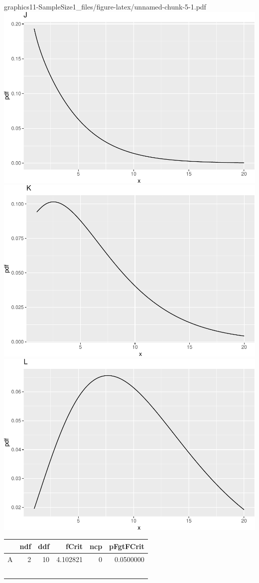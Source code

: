 \documentclass[]{book}
\begin{document}
graphics{11-SampleSize1_files/figure-latex/unnamed-chunk-5-1.pdf} \includegraphics{11-SampleSize1_files/figure-latex/unnamed-chunk-5-2.pdf} \includegraphics{11-SampleSize1_files/figure-latex/unnamed-chunk-5-3.pdf} \includegraphics{11-SampleSize1_files/figure-latex/unnamed-chunk-5-4.pdf}

\begin{tabular}{l|r|r|r|r|r}
\hline
  & ndf & ddf & fCrit & ncp & pFgtFCrit\\
\hline
A & 2 & 10 & 4.102821 & 0 & 0.0500000\\
\
\end{tabular}
\end{document}
